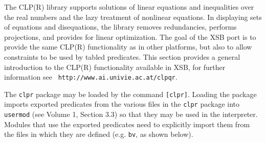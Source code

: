 The CLP(R) library supports solutions of linear equations and
inequalities over the real numbers and the lazy treatment of
nonlinear equations.  In displaying sets of equations and
disequations, the library removes redundancies, performs projections,
and provides for linear optimization.  The goal of the XSB port is to
provide the same CLP(R) functionality as in other platforms, but also
to allow constraints to be used by tabled predicates.  This section
provides a general introduction to the CLP(R) functionality available
in XSB, for further information see {\tt
http://www.ai.univie.ac.at/clpqr}.

The {\tt clpr} package may be loaded by the command {\tt [clpr]}.
Loading the package imports exported predicates from the various files
in the {\tt clpr} package into {\tt usermod} (see Volume 1, Section
3.3) so that they may be used in the interpreter.  Modules that use
the exported predicates need to explicitly import them from the files
in which they are defined (e.g. {\tt bv}, as shown below).

